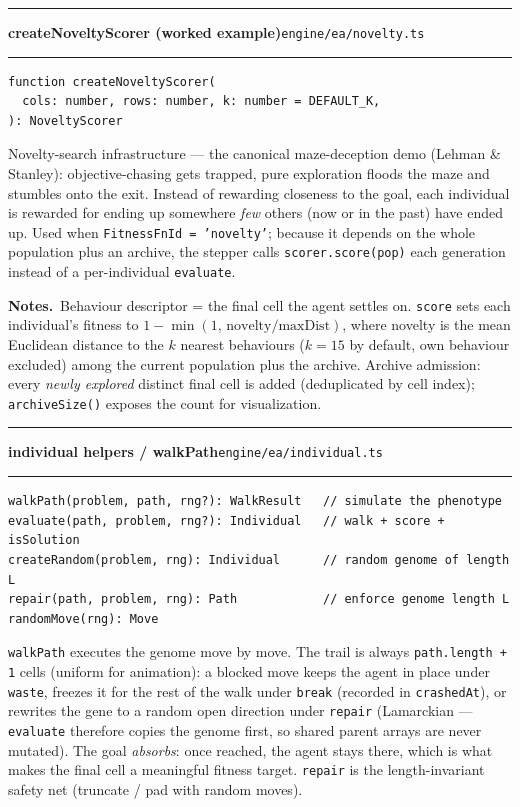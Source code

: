 \documentclass[11pt,a4paper]{report}
\newcommand{\srcfile}[1]{\texttt{\small #1}}   %
\newcommand{\ts}[1]{\texttt{#1}}               %
\newenvironment{apientry}[2]{%
  \par\medskip\noindent
  \begin{minipage}{\textwidth}
  \hrule\vspace{0.6ex}
  {\large\ttfamily\bfseries #1}\hfill{\footnotesize\srcfile{#2}}
  \vspace{0.4ex}\hrule\medskip
}{%
  \end{minipage}\par\medskip
}
\newcommand{\apifield}[1]{\par\smallskip\noindent\textbf{#1.}\ }
\begin{document}
\begin{apientry}{createNoveltyScorer (worked example)}{engine/ea/novelty.ts}
\begin{lstlisting}
function createNoveltyScorer(
  cols: number, rows: number, k: number = DEFAULT_K,
): NoveltyScorer
\end{lstlisting}
Novelty-search infrastructure --- the canonical maze-deception demo
(Lehman \& Stanley): objective-chasing gets trapped, pure exploration
floods the maze and stumbles onto the exit. Instead of rewarding
closeness to the goal, each individual is rewarded for ending up
somewhere \emph{few} others (now or in the past) have ended up. Used when
\ts{FitnessFnId = 'novelty'}; because it depends on the whole population
plus an archive, the stepper calls \ts{scorer.score(pop)} each generation
instead of a per-individual \ts{evaluate}.
\apifield{Notes}Behaviour descriptor = the final cell the agent settles
on. \ts{score} sets each individual's fitness to
$1 - \min(1,\, \mathrm{novelty} / \mathrm{maxDist})$, where novelty is
the mean Euclidean distance to the $k$ nearest behaviours ($k = 15$ by
default, own behaviour excluded) among the current population plus the
archive. Archive admission: every \emph{newly explored} distinct final
cell is added (deduplicated by cell index); \ts{archiveSize()} exposes
the count for visualization.
\end{apientry}

\begin{apientry}{individual helpers / walkPath}{engine/ea/individual.ts}
\begin{lstlisting}
walkPath(problem, path, rng?): WalkResult   // simulate the phenotype
evaluate(path, problem, rng?): Individual   // walk + score + isSolution
createRandom(problem, rng): Individual      // random genome of length L
repair(path, problem, rng): Path            // enforce genome length L
randomMove(rng): Move
\end{lstlisting}
\ts{walkPath} executes the genome move by move. The trail is always
\ts{path.length + 1} cells (uniform for animation): a blocked move keeps
the agent in place under \ts{waste}, freezes it for the rest of the walk
under \ts{break} (recorded in \ts{crashedAt}), or rewrites the gene to a
random open direction under \ts{repair} (Lamarckian --- \ts{evaluate}
therefore copies the genome first, so shared parent arrays are never
mutated). The goal \emph{absorbs}: once reached, the agent stays there,
which is what makes the final cell a meaningful fitness target.
\ts{repair} is the length-invariant safety net (truncate / pad with
random moves).
\end{apientry}
\end{document}
